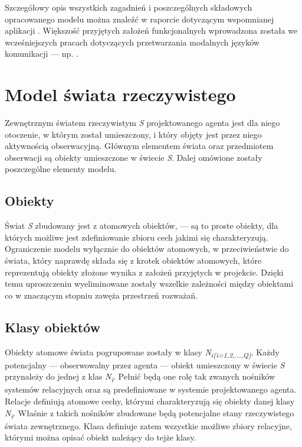 Szczegółowy opis wszystkich zagadnień i poszczególnych składowych opracowanego modelu można znaleźć w raporcie dotyczącym wspomnianej aplikacji \cite{raport}. Większość przyjętych założeń funkcjonalnych wprowadzona została we wcześniejszych pracach dotyczących przetwarzania modalnych języków komunikacji --- np. \cite{kat07} \cite{kat99}.


\section{Model świata rzeczywistego}

Zewnętrznym światem rzeczywistym \textit{S} projektowanego agenta jest dla niego otoczenie, w którym został umieszczony, i który objęty jest przez niego aktywnością obserwacyjną. Głównym elementem świata oraz przedmiotem obserwacji są obiekty umieszczone w świecie \textit{S}. Dalej omówione zostały poszczególne elementy modelu.


	\subsection{Obiekty}
	
	Świat \textit{S} zbudowany jest z atomowych obiektów, --- są to proste obiekty, dla których możliwe jest zdefiniowanie zbioru cech jakimi się charakteryzują. Ograniczenie modelu wyłącznie do obiektów atomowych, w przeciwieństwie do świata, który naprawdę składa się z krotek obiektów atomowych, które reprezentują obiekty złożone wynika z założeń przyjętych w projekcie. Dzięki temu uproszczeniu wyeliminowane zostały wszelkie zależności między obiektami co w znaczącym stopniu zawęża przestrzeń rozważań.
	
	
	\subsection{Klasy obiektów}
	
	Obiekty atomowe świata pogrupowane zostały w klasy 
	\textit{N\textsubscript{i(i=1,2,...,Q)}}. 
	Każdy potencjalny --- obserwowalny przez agenta --- obiekt umieszczony w świecie \textit{S} przynależy do jednej z klas
	\textit{N\textsubscript{i}}. 
	Pełnić będą one rolę tak zwanych nośników systemów relacyjnych oraz są predefiniowane w systemie projektowanego agenta. Relacje definiują atomowe cechy, którymi charakteryzują się obiekty danej klasy 
	\textit{N\textsubscript{i}}. 
	Właśnie z takich nośników zbudowane będą potencjalne stany rzeczywistego świata zewnętrznego. Klasa definiuje zatem wszystkie możliwe zbiory relacyjne, którymi można opisać obiekt należący do tejże klasy.
	
